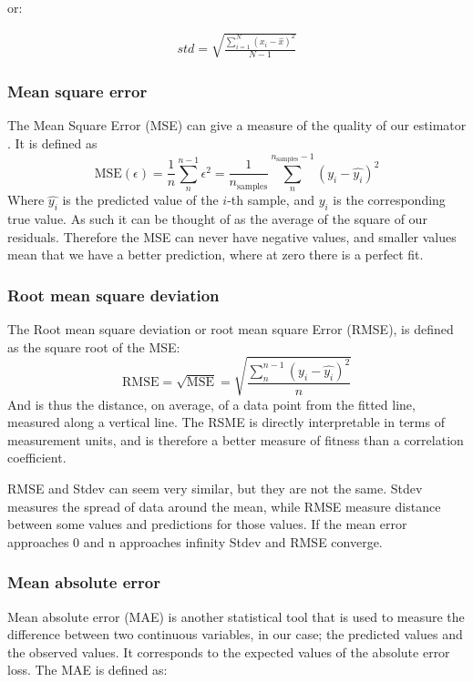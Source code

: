  or:

\begin{align}
std = \sqrt{\frac{\sum^N_{i=1} (x_i- \hat{x})^2}{N-1}}
\end{align}

\subsubsection{Mean square error}

The Mean Square Error (\ac{MSE}) can give a measure of the quality of our estimator \cite{robert2014machine}. It is defined as
\begin{equation}\label{eq: mse}
	\text{MSE}(\epsilon) = \frac{1}{n}\sum_n^{n-1}\epsilon^2 = \frac{1}{n_\text{samples}} \sum_n^{n_{\text{samples}}-1}(y_i - \hat{y_i})^2
	\end{equation}
	Where $\hat{y_i}$ is the predicted value of the $i$-th sample, and $y_i$ is the corresponding true value.
As such it can be thought of as the average of the square of our residuals. Therefore the MSE can never have negative values, and smaller values mean that we have a better prediction, where at zero there is a perfect fit.

\subsubsection{Root mean square deviation}
The Root mean square deviation or root mean square Error (\ac{RMSE}), is defined as the square root of the MSE:
$$\text{RMSE} = \sqrt{\text{MSE}} =  \sqrt{\frac{\sum^{n-1}_{n}(y_{i}-\hat{y_{i}})^2 }{n}} $$
And is thus the distance, on average, of a data point from the fitted line, measured along a vertical line. The RSME is directly interpretable in terms of measurement units, and is therefore a better measure of fitness than a correlation coefficient.

RMSE and Stdev can seem very similar, but they are not the same. Stdev measures the spread of data around the mean, while RMSE measure distance between some values and predictions for those values. If the mean error approaches $0$ and n approaches infinity Stdev and RMSE converge.

\subsubsection{Mean absolute error}
Mean absolute error (\ac{MAE}) is another statistical tool that is used to measure the difference between two continuous variables, in our case; the predicted values and the observed values. It corresponds to the expected values of the absolute error loss. The MAE is defined as:

